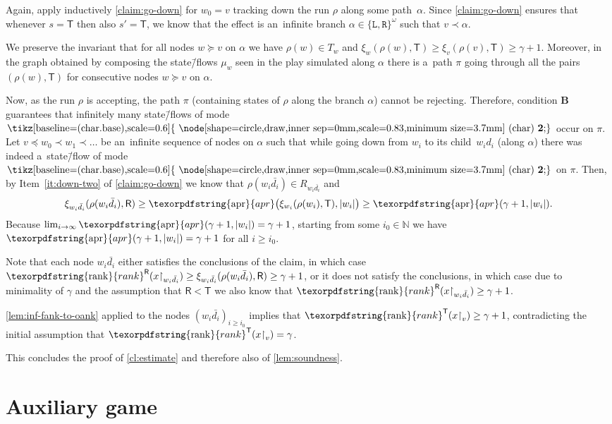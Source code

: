 \documentclass[11pt,a4paper]{amsart}
\theoremstyle{plain}
\theoremstyle{definition}
\theoremstyle{defC}
\theoremstyle{thmC}
\theoremstyle{plain}
\numberwithin{equation}{section}
\numberwithin{equation}{section}
\numberwithin{figure}{section}
\newcommand{\ident}[1]{\ensuremath{\texorpdfstring{\mathrm{\mathnm{#1}}}{#1}}\xspace}
\newcommand{\domain}[1]{\ensuremath{\mathbb{#1}}\xspace}
\newcommand{\N}{\domain{N}}
\newcommand{\dL}{\mathtt{{\scriptstyle L}}}
\newcommand{\dR}{\mathtt{{\scriptstyle R}}}
\newcommand{\mathnm}[1]{#1}
\newcommand{\restr}{{\upharpoonright}}
\newcommand{\sT}{\mathsf{T}}
\newcommand{\sR}{\mathsf{R}}
\newcommand{\rankR}{\ident{rank}^\sR}
\newcommand{\rankT}{\ident{rank}^\sT}
\newcommand{\apr}{\ident{apr}}
\newcommand*\circled[1]{\tikz[baseline=(char.base),scale=0.6]{
            \node[shape=circle,draw,inner sep=0mm,scale=0.83,minimum size=3.7mm] (char) {\textbf{#1}};}}
\newcommand{\fb}{\mathbf{\text{\circled{2}}}}
\newcommand{\itemfont}[1]{\textbf{#1}}
\begin{document}
	Again, apply inductively \cref{claim:go-down} for $w_0=v$ tracking down the run $\rho$ along some path~$\alpha$.
	Since \cref{claim:go-down} ensures that whenever $s=\sT$ then also $s'=\sT$, we know that the effect is an~infinite branch $\alpha\in\{\dL,\dR\}^\omega$ such that $v\prec \alpha$.

	We preserve the invariant that for all nodes $w\succeq v$ on $\alpha$ we have $\rho(w)\in T_w$ and $\xi_w(\rho(w),\sT)\geq\xi_v(\rho(v),\sT)\geq\gamma+1$.
	Moreover, in the graph obtained by composing the state\=/flows $\mu_w$ seen in the play simulated along $\alpha$
	there is a~path $\pi$ going through all the pairs $(\rho(w),\sT)$ for consecutive nodes $w\succeq v$ on $\alpha$.

	Now, as the run $\rho$ is accepting, the path $\pi$ (containing states of $\rho$ along the branch $\alpha$) cannot be rejecting.
	Therefore, condition \itemfont{B} guarantees that infinitely many state\=/flows of mode $\fb$ occur on $\pi$.
	Let $v\preceq w_0\prec w_1 \prec \ldots$ be an~infinite sequence of nodes on $\alpha$ such that while going down from $w_i$ to its child~$w_id_i$ (along $\alpha$) there was indeed a~state\=/flow of mode~$\fb$ on $\pi$.
	Then, by Item~\ref{it:down-two} of \cref{claim:go-down} we know that $\rho(w_i\bar{d_i})\in R_{w_i\bar{d_i}}$ and
	\begin{align*}
		\xi_{w_i\bar{d_i}}(\rho(w_i\bar{d_i}),\sR)\geq\apr\big(\xi_{w_i}(\rho(w_i),\sT),|w_i|\big)\geq\apr(\gamma+1,|w_i|).
	\end{align*}
	Because $\lim_{i\to\infty}\apr(\gamma+1,|w_i|)=\gamma+1$, starting from some $i_0\in\N$ we have $\apr(\gamma+1,|w_i|)=\gamma+1$ for all $i\geq i_0$.
	
	Note that each node $w_i\bar{d_i}$ either satisfies the conclusions of the claim, in which case $\rankR(x\restr_{w_i\bar{d_i}})\geq \xi_{w_i\bar{d_i}}(\rho(w_i\bar{d_i}),\sR)\geq\gamma+1$,
	or it does not satisfy the conclusions, in which case due to minimality of $\gamma$ and the assumption that $\sR<\sT$ we also know that $\rankR(x\restr_{w_i\bar{d_i}})\geq \gamma+1$.

	\cref{lem:inf-fank-to-oank} applied to the nodes $(w_i\bar{d_i})_{i\geq i_0}$ implies that
	$\rankT(x\restr_v)\geq \gamma+1$, contradicting the initial assumption that $\rankT(x\restr_v)=\gamma$.

This concludes the proof of \cref{cl:estimate} and therefore also of \cref{lem:soundness}.



\section{Auxiliary game}
\label{sec:aux-game}
\end{document}
